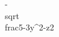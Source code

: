 \documentclass[preview]{standalone}
\begin{document}
\begin{center}
-\\sqrt{\\frac{5-3y^2-z}{2}}
\end{center}
\end{document}

